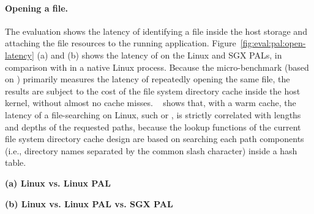 \paragraph{Opening a file.}
The evaluation shows the latency of identifying a file inside the host storage and attaching the file resources to the running application. 
Figure~\ref{fig:eval:pal:open-latency} (a) and (b) shows the latency of  on the Linux and SGX PALs,
in comparison with  in a native Linux process.
Because the micro-benchmark
(based on \lmbench{})
primarily measures the latency of repeatedly opening the same file, the results are subject to the cost of
the file system directory cache inside the host kernel,
without almost no cache misses.
\citeauthor{tsai15dcache}~\cite{tsai15dcache}
shows that, with a warm cache,
the latency of a file-searching \linuxapi{} on Linux,
such  or , 
is strictly correlated with
lengths and depths of the requested paths,
because the lookup functions of the current file system directory cache design
are based on searching each path components
(i.e., directory names separated by the common slash character)
inside a hash table.

\begin{figure*}[t!]
\centering
\footnotesize
{}
\parbox{0.49\textwidth}{\centering\bf (a) Linux vs. Linux PAL}
\parbox{0.49\textwidth}{\centering\bf (b) Linux vs. Linux PAL vs. SGX PAL}
\caption{Latency of  on the Linux PAL  and SGX PAL, versus  on Linux.
Lower is better.
Figure (a) compares  on the Linux PAL,
with and without a \seccomp{} filter ({\bf +SC})
and reference monitor ({\bf +RM}), against  on Linux. Figure (b) compares  on a SGX PAL,
with and without integrity checks ({\bf +CHK}),
against the Linux PAL and  on Linux.}
\label{fig:eval:pal:open-latency}
\end{figure*}

